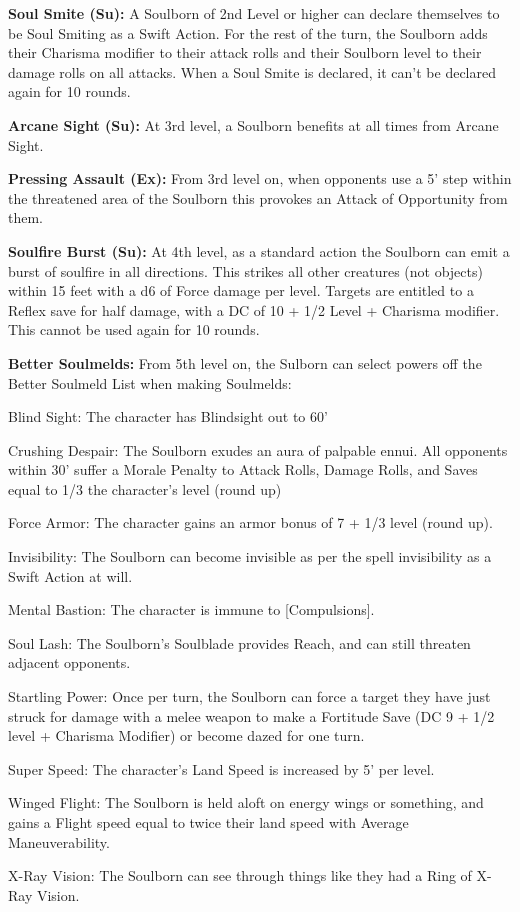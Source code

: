 \textbf{Soul Smite (Su):} A Soulborn of 2nd Level or higher can declare themselves to be Soul Smiting as a Swift Action. For the rest of the turn, the Soulborn adds their Charisma modifier to their attack rolls and their Soulborn level to their damage rolls on all attacks. When a Soul Smite is declared, it can't be declared again for 10 rounds.

\textbf{Arcane Sight (Su):} At 3rd level, a Soulborn benefits at all times from Arcane Sight.

\textbf{Pressing Assault (Ex):} From 3rd level on, when opponents use a 5' step within the threatened area of the Soulborn this provokes an Attack of Opportunity from them.

\textbf{Soulfire Burst (Su):} At 4th level, as a standard action the Soulborn can emit a burst of soulfire in all directions. This strikes all other creatures (not objects) within 15 feet with a d6 of Force damage per level. Targets are entitled to a Reflex save for half damage, with a DC of 10 + 1/2 Level + Charisma modifier. This cannot be used again for 10 rounds.

\textbf{Better Soulmelds:} From 5th level on, the Sulborn can select powers off the Better Soulmeld List when making Soulmelds:
\begin{description*}
\item[Blind Sight:] The character has Blindsight out to 60'
\item[Crushing Despair:] The Soulborn exudes an aura of palpable ennui. All opponents within 30' suffer a Morale Penalty to Attack Rolls, Damage Rolls, and Saves equal to 1/3 the character's level (round up)
\item[Force Armor:] The character gains an armor bonus of 7 + 1/3 level (round up).
\item[Invisibility:] The Soulborn can become invisible as per the spell invisibility as a Swift Action at will.
\item[Mental Bastion:] The character is immune to [Compulsions].
\item[Soul Lash:] The Soulborn's Soulblade provides Reach, and can still threaten adjacent opponents.
\item[Startling Power:] Once per turn, the Soulborn can force a target they have just struck for damage with a melee weapon to make a Fortitude Save (DC 9 + 1/2 level + Charisma Modifier) or become dazed for one turn.
\item[Super Speed:] The character's Land Speed is increased by 5' per level.
\item[Winged Flight:] The Soulborn is held aloft on energy wings or something, and gains a Flight speed equal to twice their land speed with Average Maneuverability.
\item[X-Ray Vision:] The Soulborn can see through things like they had a Ring of X-Ray Vision.
\end{description*}

